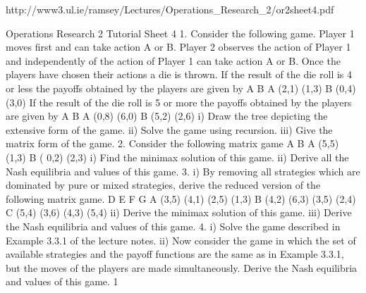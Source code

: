 http://www3.ul.ie/ramsey/Lectures/Operations_Research_2/or2sheet4.pdf


Operations Research 2
Tutorial Sheet 4
1. Consider the following game. Player 1 moves first and can take action A or B.
Player 2 observes the action of Player 1 and independently of the action of Player 1 can
take action A or B. Once the players have chosen their actions a die is thrown. If the
result of the die roll is 4 or less the payoffs obtained by the players are given by
A B
A (2,1) (1,3)
B (0,4) (3,0)
If the result of the die roll is 5 or more the payoffs obtained by the players are given
by
A B
A (0,8) (6,0)
B (5,2) (2,6)
i) Draw the tree depicting the extensive form of the game.
ii) Solve the game using recursion.
iii) Give the matrix form of the game.
2. Consider the following matrix game
A B
A (5,5) (1,3)
B ( 0,2) (2,3)
i) Find the minimax solution of this game.
ii) Derive all the Nash equilibria and values of this game.
3. i) By removing all strategies which are dominated by pure or mixed strategies,
derive the reduced version of the following matrix game.
D E F G
A (3,5) (4,1) (2,5) (1,3)
B (4,2) (6,3) (3,5) (2,4)
C (5,4) (3,6) (4,3) (5,4)
ii) Derive the minimax solution of this game.
iii) Derive the Nash equilibria and values of this game.
4. i) Solve the game described in Example 3.3.1 of the lecture notes.
ii) Now consider the game in which the set of available strategies and the payoff functions
are the same as in Example 3.3.1, but the moves of the players are made simultaneously.
Derive the Nash equilibria and values of this game.
1

